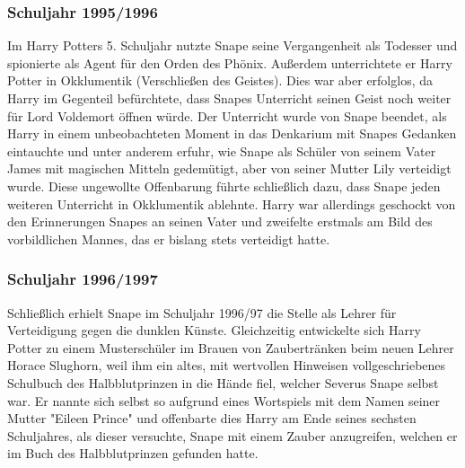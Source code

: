 \documentclass[a4paper, 10pt]{article}
\begin{document}
\subsubsection*{Schuljahr     1995/1996}
Im Harry Potters 5. Schuljahr nutzte Snape seine Vergangenheit als Todesser und spionierte als Agent für den Orden des Phönix. Außerdem unterrichtete er Harry Potter in Okklumentik (Verschließen des Geistes). Dies war aber erfolglos, da Harry im Gegenteil befürchtete, dass Snapes Unterricht seinen Geist noch weiter für Lord Voldemort öffnen würde. Der Unterricht wurde von Snape beendet, als Harry in einem unbeobachteten Moment in das Denkarium mit Snapes Gedanken eintauchte und unter anderem erfuhr, wie Snape als Schüler von seinem Vater James mit magischen Mitteln gedemütigt, aber von seiner Mutter Lily verteidigt wurde. Diese ungewollte Offenbarung führte schließlich dazu, dass Snape jeden weiteren Unterricht in Okklumentik ablehnte. Harry war allerdings geschockt von den Erinnerungen Snapes an seinen Vater und zweifelte erstmals am Bild des vorbildlichen Mannes, das er bislang stets verteidigt hatte.

\subsubsection*{Schuljahr 1996/1997}
Schließlich erhielt Snape im Schuljahr 1996/97 die Stelle als Lehrer für Verteidigung gegen die dunklen Künste. Gleichzeitig entwickelte sich Harry Potter zu einem Musterschüler im Brauen von Zaubertränken beim neuen Lehrer Horace Slughorn, weil ihm ein altes, mit wertvollen Hinweisen vollgeschriebenes Schulbuch des Halbblutprinzen in die Hände fiel, welcher Severus Snape selbst war. Er nannte sich selbst so aufgrund eines Wortspiels mit dem Namen seiner Mutter "Eileen Prince" und offenbarte dies Harry am Ende seines sechsten Schuljahres, als dieser versuchte, Snape mit einem Zauber anzugreifen, welchen er im Buch des Halbblutprinzen gefunden hatte.
\vspace{10pt}
\newline
\end{document}
